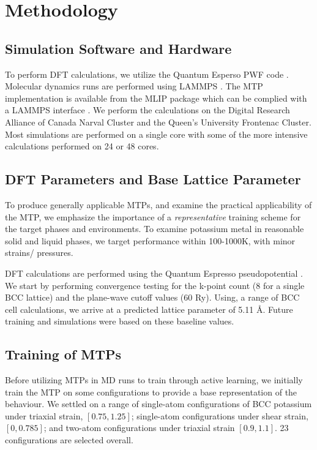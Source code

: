 \documentclass[9pt,twocolumn,twoside]{opticajnl}
\begin{document}
\section{Methodology}

\subsection{Simulation Software and Hardware}
To perform DFT calculations, we utilize the Quantum Esperso PWF code \cite{QE}. Molecular dynamics runs are performed using LAMMPS  \cite{LAMMPS}. The MTP implementation is available from the MLIP package which can be complied with a LAMMPS interface \cite{mlip}. We perform the calculations on the Digital Research Alliance of Canada Narval Cluster and the Queen's University Frontenac Cluster. Most simulations are performed on a single core with some of the more intensive calculations performed on 24 or 48 cores. 

\subsection{DFT Parameters and Base Lattice Parameter}
To produce generally applicable MTPs, and examine the practical applicability of the MTP, we emphasize the importance of a \textit{representative} training scheme for the target phases and environments. To examine potassium metal in reasonable solid and liquid phases, we target performance within 100-1000K, with minor strains/ pressures.

DFT calculations are performed using the Quantum Espresso pseudopotential \cite{DFT}. We start by performing convergence testing for the k-point count (8 for a single BCC lattice) and the plane-wave cutoff values (60 Ry). Using, a range of BCC cell calculations, we arrive at a predicted lattice parameter of 5.11 Å. Future training and simulations were based on these baseline values. 

\subsection{Training of MTPs}
Before utilizing MTPs in MD runs to train through active learning, we initially train the MTP on some configurations to provide a base representation of the behaviour. We settled on a range of single-atom configurations of BCC potassium under triaxial strain, $[0.75, 1.25]$; single-atom configurations under shear strain, $[0, 0.785]$; and two-atom configurations under triaxial strain $[0.9, 1.1]$. 23 configurations are selected overall.
\end{document}
